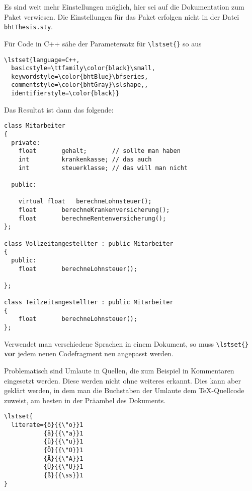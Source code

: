 Es sind weit  mehr Einstellungen möglich, hier sei auf  die Dokumentation zum Paket
verwiesen.  Die   Einstellungen  für  das   Paket  erfolgen  nicht  in   der  Datei
\texttt{bhtThesis.sty}.

Für Code in C++ sähe der Parametersatz für \texttt{\textbackslash lstset\{\}} so aus
\begin{lstlisting}
\lstset{language=C++,
  basicstyle=\ttfamily\color{black}\small,
  keywordstyle=\color{bhtBlue}\bfseries,
  commentstyle=\color{bhtGray}\slshape,,
  identifierstyle=\color{black}}
\end{lstlisting}

Das Resultat ist dann das folgende:

\begin{lstlisting}
class Mitarbeiter
{
  private:              
    float		gehalt;       // sollte man haben
    int			krankenkasse; // das auch
    int			steuerklasse; // das will man nicht

  public:
    
    virtual float	berechneLohnsteuer();
    float		berechneKrankenversicherung();
    float		berechneRentenversicherung();
};

class Vollzeitangestellter : public Mitarbeiter
{
  public:
    float		berechneLohnsteuer();

};

class Teilzeitangestellter : public Mitarbeiter
{
    float		berechneLohnsteuer();
};
\end{lstlisting}

Verwendet    man   verschiedene    Sprachen    in   einem    Dokument,   so    muss
\texttt{\textbackslash  lstset\{\}}  \textbf{vor}   jedem  neuen  Codefragment  neu
angepasst werden.

Problematisch sind Umlaute  in Quellen, die zum Beispiel  in Kommentaren eingesetzt
werden. Diese werden nicht ohne weiteres erkannt. Dies kann aber geklärt werden, in
dem man  die Buchstaben der  Umlaute dem \TeX-Quellcode  zuweist, am besten  in der
Präambel des Dokuments.

\begin{lstlisting}
\lstset{ 
  literate={ö}{{\"o}}1
           {ä}{{\"a}}1
           {ü}{{\"u}}1
           {Ö}{{\"O}}1
           {Ä}{{\"A}}1
           {Ü}{{\"U}}1
           {ß}{{\ss}}1
}
\end{lstlisting}


